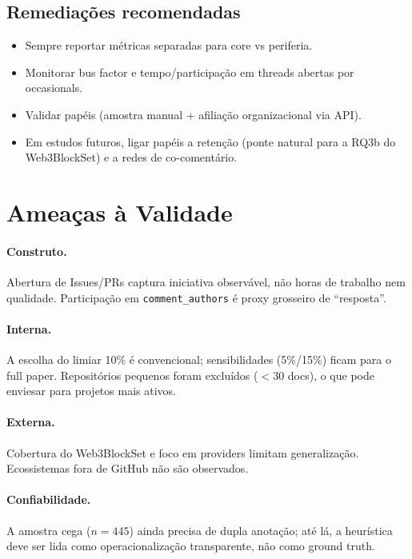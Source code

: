 \documentclass[10pt,conference]{IEEEtran}
\begin{document}
\subsection{Remediações recomendadas}
\begin{itemize}
\item Sempre reportar métricas separadas para core vs periferia.
\item Monitorar bus factor e tempo/participação em threads abertas por occasionals.
\item Validar papéis (amostra manual + afiliação organizacional via API).
\item Em estudos futuros, ligar papéis a retenção (ponte natural para a RQ3b do Web3BlockSet) e a redes de co-comentário.
\end{itemize}

\section{Ameaças à Validade}

\paragraph{Construto.}
Abertura de Issues/PRs captura iniciativa observável, não horas de trabalho nem qualidade. Participação em \texttt{comment\_authors} é proxy grosseiro de ``resposta''.

\paragraph{Interna.}
A escolha do limiar 10\% é convencional; sensibilidades (5\%/15\%) ficam para o full paper. Repositórios pequenos foram excluídos ($<$30 docs), o que pode enviesar para projetos mais ativos.

\paragraph{Externa.}
Cobertura do Web3BlockSet e foco em providers limitam generalização. Ecossistemas fora de GitHub não são observados.

\paragraph{Confiabilidade.}
A amostra cega ($n{=}445$) ainda precisa de dupla anotação; até lá, a heurística deve ser lida como operacionalização transparente, não como ground truth.
\end{document}
